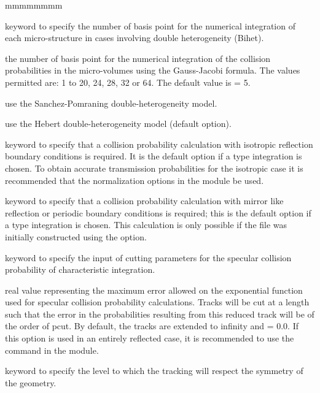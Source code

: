 \begin{ListeDeDescription}{mmmmmmmm}
\item[\moc{QUAB}] keyword to specify the number of basis point for the
numerical integration of each micro-structure in cases involving double
heterogeneity (Bihet).

\item[\dusa{iquab}] the number of basis point for the numerical integration of
the collision probabilities in the micro-volumes using the Gauss-Jacobi
formula. The values permitted are: 1 to 20, 24, 28, 32 or 64. The default value
is  = 5.

\item[\moc{SAPO}] use the Sanchez-Pomraning double-heterogeneity model.\cite{sapo}

\item[\moc{HEBE}] use the Hebert double-heterogeneity model (default option).\cite{BIHET}

\item[\moc{PISO}] keyword to specify that a collision probability calculation with isotropic reflection boundary 
conditions is required. It is the default option if a  type integration is chosen. To obtain accurate
transmission probabilities for the isotropic case it is recommended that the normalization 
options in the  module be used. 

\item[\moc{PSPC}] keyword to specify that a collision probability calculation with mirror like reflection or periodic 
boundary conditions is required; this is the default option if a  type integration is chosen. 
This calculation is only possible if the file was initially constructed using the  option. 

\item[\moc{CUT}] keyword to specify the input of cutting parameters for the specular collision probability
of characteristic integration. 

\item[\dusa{pcut}] real value representing the maximum error allowed on the exponential function used
for specular collision probability calculations. Tracks will be cut at a length such that the error in the 
probabilities resulting from this reduced track will be of the order of pcut. By default, the tracks 
are extended to infinity and  = 0.0. If this option is used in an entirely reflected case, it is 
recommended to use the  command in the  module. 

\item[\moc{SYMM}] keyword to specify the level to which the tracking will respect the symmetry of the geometry. 


\end{ListeDeDescription}
